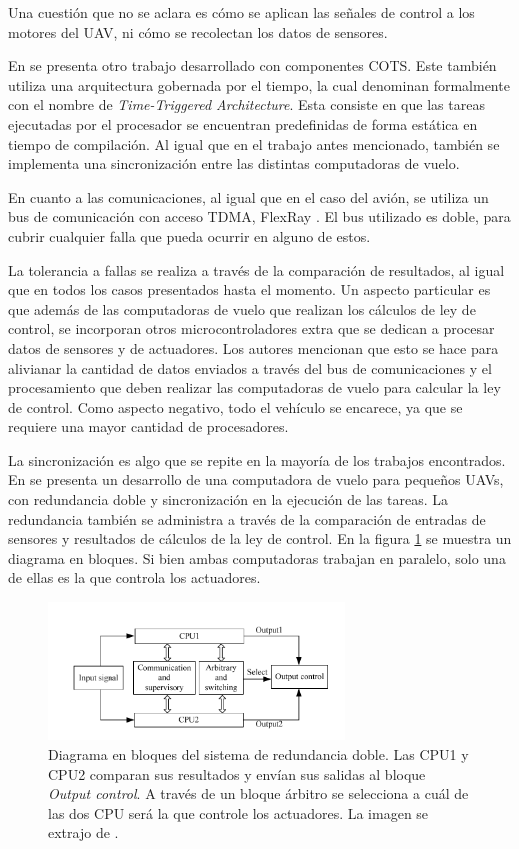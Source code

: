 Una cuestión que no se aclara es cómo se aplican las señales de control a los motores del UAV, ni cómo se recolectan los datos de sensores.

En \cite{zhang2020architecture} se presenta otro trabajo desarrollado con componentes COTS. Este también utiliza una arquitectura gobernada por el tiempo, la cual denominan formalmente con el nombre de \textit{Time-Triggered Architecture}. Esta consiste en que las tareas ejecutadas por el procesador se encuentran predefinidas de forma estática en tiempo de compilación. Al igual que en el trabajo antes mencionado, también se implementa una sincronización entre las distintas computadoras de vuelo.

En cuanto a las comunicaciones, al igual que en el caso del avión, se utiliza un bus de comunicación con acceso TDMA, FlexRay \cite{nxpAN12233}. El bus utilizado es doble, para cubrir cualquier falla que pueda ocurrir en alguno de estos. 

La tolerancia a fallas se realiza a través de la comparación de resultados, al igual que en todos los casos presentados hasta el momento. Un aspecto particular es que además de las computadoras de vuelo que realizan los cálculos de ley de control, se incorporan otros microcontroladores extra que se dedican a procesar datos de sensores y de actuadores. Los autores mencionan que esto se hace para alivianar la cantidad de datos enviados a través del bus de comunicaciones y el procesamiento que deben realizar las computadoras de vuelo para calcular la ley de control. Como aspecto negativo, todo el vehículo se encarece, ya que se requiere una mayor cantidad de procesadores.

La sincronización es algo que se repite en la mayoría de los trabajos encontrados. En \cite{zhang2015dual} se presenta un desarrollo de una computadora de vuelo para pequeños UAVs, con redundancia doble y sincronización en la ejecución de las tareas. La redundancia también se administra a través de la comparación de entradas de sensores y resultados de cálculos de la ley de control. En la figura \ref{fig:FCC_dual_FPGA} se muestra un diagrama en bloques. Si bien ambas computadoras trabajan en paralelo, solo una de ellas es la que controla los actuadores. 

\begin{figure}[htb]
    \centering
    \includegraphics[width=0.7\textwidth]{img/FCC_dual_FPGA.png}
    \caption{Diagrama en bloques del sistema de redundancia doble. Las CPU1 y CPU2 comparan sus resultados y envían sus salidas al bloque \textit{Output control}. A través de un bloque árbitro se selecciona a cuál de las dos CPU será la que controle los actuadores. La imagen se extrajo de \cite{zhang2015dual}.}
    \label{fig:FCC_dual_FPGA}
\end{figure}

